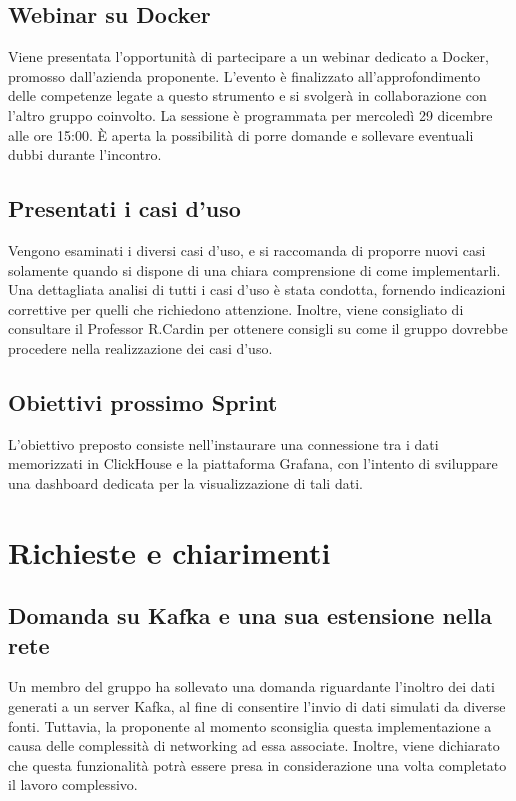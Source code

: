 \documentclass{article}
\begin{document}
\subsection{Webinar su Docker}
Viene presentata l'opportunità di partecipare a un webinar dedicato a Docker, promosso dall'azienda proponente. L'evento è finalizzato all'approfondimento delle competenze legate a questo strumento e si svolgerà in collaborazione con l'altro gruppo coinvolto. La sessione è programmata per mercoledì 29 dicembre alle ore 15:00. È aperta la possibilità di porre domande e sollevare eventuali dubbi durante l'incontro.
\subsection{Presentati i casi d'uso}
Vengono esaminati i diversi casi d'uso, e si raccomanda di proporre nuovi casi solamente quando si dispone di una chiara comprensione di come implementarli. Una dettagliata analisi di tutti i casi d'uso è stata condotta, fornendo indicazioni correttive per quelli che richiedono attenzione.
 Inoltre, viene consigliato di consultare il Professor R.Cardin per ottenere consigli su come il gruppo dovrebbe procedere nella realizzazione dei casi d'uso.
\subsection{Obiettivi prossimo Sprint}
L'obiettivo preposto consiste nell'instaurare una connessione tra i dati memorizzati in ClickHouse e la piattaforma Grafana, con l'intento di sviluppare una dashboard dedicata per la visualizzazione di tali dati.
\section{Richieste e chiarimenti}
    \subsection{Domanda su Kafka e una sua estensione nella rete}
    Un membro del gruppo ha sollevato una domanda riguardante l'inoltro dei dati generati a un server Kafka, al fine di consentire l'invio di dati simulati da diverse fonti. Tuttavia, la proponente al momento sconsiglia questa implementazione a causa delle complessità di networking ad essa associate. 
    Inoltre, viene dichiarato che questa funzionalità potrà essere presa in considerazione una volta completato il lavoro complessivo.
\end{document}
